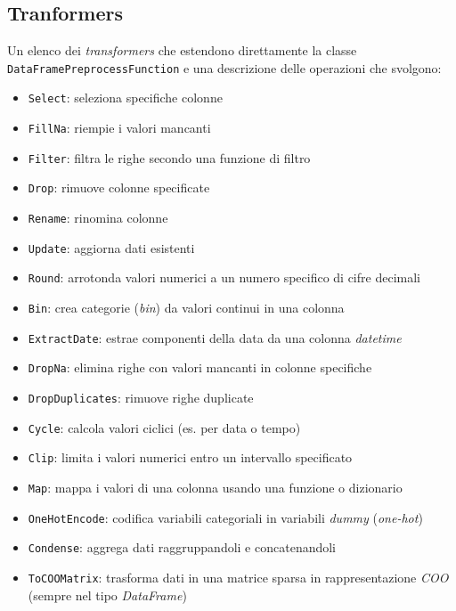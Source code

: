 \subsection{Tranformers}

Un elenco dei \textit{transformers} che estendono direttamente la classe \\
\texttt{DataFramePreprocessFunction} e una descrizione delle operazioni che svolgono:

\begin{itemize}
    \item \texttt{Select}: seleziona specifiche colonne
    \item \texttt{FillNa}: riempie i valori mancanti
    \item \texttt{Filter}: filtra le righe secondo una funzione di filtro
    \item \texttt{Drop}: rimuove colonne specificate
    \item \texttt{Rename}: rinomina colonne
    \item \texttt{Update}: aggiorna dati esistenti
    \item \texttt{Round}: arrotonda valori numerici a un numero specifico di cifre decimali
    \item \texttt{Bin}: crea categorie (\textit{bin}) da valori continui in una colonna
    \item \texttt{ExtractDate}: estrae componenti della data da una colonna \textit{datetime}
    \item \texttt{DropNa}: elimina righe con valori mancanti in colonne specifiche
    \item \texttt{DropDuplicates}: rimuove righe duplicate
    \item \texttt{Cycle}: calcola valori ciclici (es. per data o tempo)
    \item \texttt{Clip}: limita i valori numerici entro un intervallo specificato
    \item \texttt{Map}: mappa i valori di una colonna usando una funzione o dizionario
    \item \texttt{OneHotEncode}: codifica variabili categoriali in variabili \textit{dummy} (\textit{one-hot})
    \item \texttt{Condense}: aggrega dati raggruppandoli e concatenandoli
    \item \texttt{ToCOOMatrix}: trasforma dati in una matrice sparsa in rappresentazione \textit{COO} (sempre nel tipo \textit{DataFrame})
\end{itemize}

